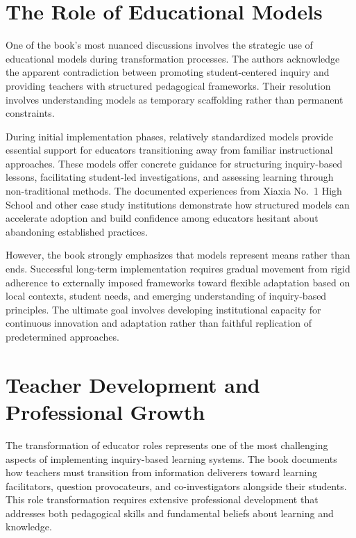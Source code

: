 \documentclass[
  Letterpaper,
]{scrbook}
\begin{document}
\section{The Role of Educational
Models}\label{the-role-of-educational-models}

One of the book's most nuanced discussions involves the strategic use of
educational models during transformation processes. The authors
acknowledge the apparent contradiction between promoting
student-centered inquiry and providing teachers with structured
pedagogical frameworks. Their resolution involves understanding models
as temporary scaffolding rather than permanent constraints.

During initial implementation phases, relatively standardized models
provide essential support for educators transitioning away from familiar
instructional approaches. These models offer concrete guidance for
structuring inquiry-based lessons, facilitating student-led
investigations, and assessing learning through non-traditional methods.
The documented experiences from Xiaxia No.~1 High School and other case
study institutions demonstrate how structured models can accelerate
adoption and build confidence among educators hesitant about abandoning
established practices.

However, the book strongly emphasizes that models represent means rather
than ends. Successful long-term implementation requires gradual movement
from rigid adherence to externally imposed frameworks toward flexible
adaptation based on local contexts, student needs, and emerging
understanding of inquiry-based principles. The ultimate goal involves
developing institutional capacity for continuous innovation and
adaptation rather than faithful replication of predetermined approaches.

\section{Teacher Development and Professional
Growth}\label{teacher-development-and-professional-growth-1}

The transformation of educator roles represents one of the most
challenging aspects of implementing inquiry-based learning systems. The
book documents how teachers must transition from information deliverers
toward learning facilitators, question provocateurs, and
co-investigators alongside their students. This role transformation
requires extensive professional development that addresses both
pedagogical skills and fundamental beliefs about learning and knowledge.
\end{document}
